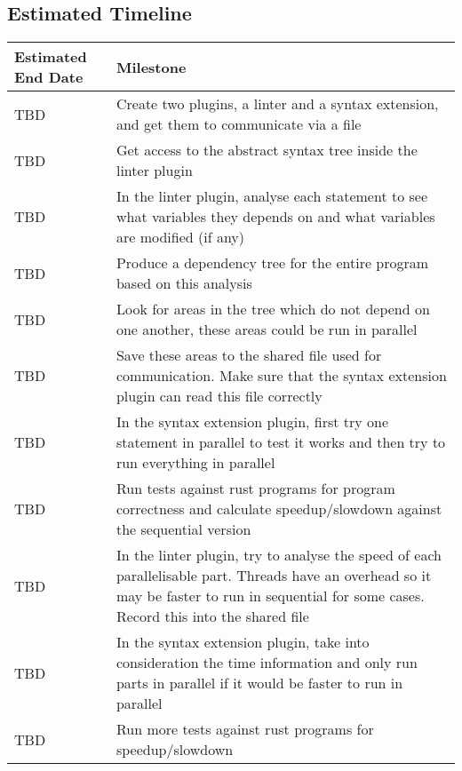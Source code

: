 \documentclass[12pt, a4paper]{article}
\begin{document}
\subsection{Estimated Timeline}
\begin{tabularx}{\textwidth}{ | >{\hsize=0.15\hsize}X | >{\hsize=0.85\hsize}X |}
	\hline
	\textbf{Estimated End Date} & \textbf{Milestone} \\
	\hline
	TBD & Create two plugins, a linter and a syntax extension, and get them to communicate via a file \\
	\hline
	TBD & Get access to the abstract syntax tree inside the linter plugin \\
	\hline
	TBD & In the linter plugin, analyse each statement to see what variables they depends on and what variables are modified (if any) \\
	\hline
	TBD & Produce a dependency tree for the entire program based on this analysis \\
	\hline
	TBD & Look for areas in the tree which do not depend on one another, these areas could be run in parallel \\
	\hline
	TBD & Save these areas to the shared file used for communication. Make sure that the syntax extension plugin can read this file correctly \\
	\hline
	TBD & In the syntax extension plugin, first try one statement in parallel to test it works and then try to run everything in parallel \\
	\hline
	TBD & Run tests against rust programs for program correctness and calculate speedup/slowdown against the sequential version \\
	\hline
	TBD & In the linter plugin, try to analyse the speed of each parallelisable part. Threads have an overhead so it may be faster to run in sequential for some cases. Record this into the shared file \\
	\hline
	TBD & In the syntax extension plugin, take into consideration the time information and only run parts in parallel if it would be faster to run in parallel \\
	\hline
	TBD & Run more tests against rust programs for speedup/slowdown \\
	\hline
\end{tabularx}
\end{document}
